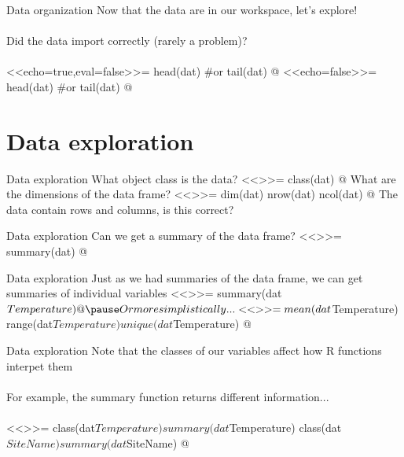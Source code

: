 \documentclass[xcolor=svgnames]{beamer}
\begin{document}
\begin{frame}[fragile]{Data organization}
Now that the data are in our workspace, let's explore!\\~\\
\pause
Did the data import correctly (rarely a problem)?\\~\\
<<echo=true,eval=false>>=
head(dat) #or tail(dat)
@
\scriptsize
<<echo=false>>=
head(dat) #or tail(dat)
@
\end{frame}

\section{Data exploration}

\begin{frame}[fragile]{Data exploration}
What object class is the data?
<<>>=
class(dat)
@
\pause
What are the dimensions of the data frame?
<<>>=
dim(dat)
nrow(dat)
ncol(dat)
@
The data contain  rows and  columns, is this correct?
\end{frame}

\begin{frame}[fragile]{Data exploration}
Can we get a summary of the data frame?
\pause
<<>>=
summary(dat)
@
\end{frame}


\begin{frame}[fragile]{Data exploration}
Just as we had summaries of the data frame, we can get summaries of individual variables
<<>>=
summary(dat$Temperature)
@
\pause
Or more simplistically...
<<>>=
mean(dat$Temperature)
range(dat$Temperature)
unique(dat$Temperature)
@
\end{frame}

\begin{frame}[fragile]{Data exploration}
Note that the classes of our variables affect how R functions interpet them\\~\\
For example, the summary function returns different information...\\~\\
\small
<<>>=
class(dat$Temperature)
summary(dat$Temperature)
class(dat$SiteName)
summary(dat$SiteName)
@
\end{frame}
\end{document}
